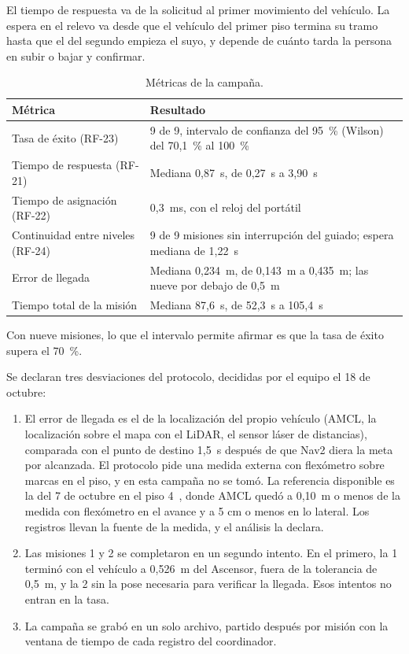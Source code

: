 \documentclass[12pt,letterpaper]{article}
\begin{document}
El tiempo de respuesta va de la solicitud al primer movimiento del vehículo. La espera en el relevo va desde que el vehículo del primer piso termina su tramo hasta que el del segundo empieza el suyo, y depende de cuánto tarda la persona en subir o bajar y confirmar.

\begin{table}[H]
    \centering
    \small
    \caption{Métricas de la campaña.}
    \label{tab:metricas}
    \begin{tabular}{@{}p{6.0cm}p{8.0cm}@{}}
        \toprule
        \textbf{Métrica} & \textbf{Resultado} \\ \midrule
        Tasa de éxito (RF-23) & 9 de 9, intervalo de confianza del 95~\% (Wilson) del 70,1~\% al 100~\% \\ \addlinespace
        Tiempo de respuesta (RF-21) & Mediana 0,87~s, de 0,27~s a 3,90~s \\ \addlinespace
        Tiempo de asignación (RF-22) & 0,3~ms, con el reloj del portátil \\ \addlinespace
        Continuidad entre niveles (RF-24) & 9 de 9 misiones sin interrupción del guiado; espera mediana de 1,22~s \\ \addlinespace
        Error de llegada & Mediana 0,234~m, de 0,143~m a 0,435~m; las nueve por debajo de 0,5~m \\ \addlinespace
        Tiempo total de la misión & Mediana 87,6~s, de 52,3~s a 105,4~s \\ \bottomrule
    \end{tabular}
\end{table}

Con nueve misiones, lo que el intervalo permite afirmar es que la tasa de éxito supera el 70~\%.

Se declaran tres desviaciones del protocolo, decididas por el equipo el 18 de octubre:

\begin{enumerate}[leftmargin=*]
    \item El error de llegada es el de la localización del propio vehículo (AMCL, la localización sobre el mapa con el LiDAR, el sensor láser de distancias), comparada con el punto de destino 1,5~s después de que Nav2 diera la meta por alcanzada. El protocolo pide una medida externa con flexómetro sobre marcas en el piso, y en esta campaña no se tomó. La referencia disponible es la del 7 de octubre en el piso 4~\cite{piso4}, donde AMCL quedó a 0,10~m o menos de la medida con flexómetro en el avance y a 5 cm o menos en lo lateral. Los registros llevan la fuente de la medida, y el análisis la declara.
    \item Las misiones 1 y 2 se completaron en un segundo intento. En el primero, la 1 terminó con el vehículo a 0,526~m del Ascensor, fuera de la tolerancia de 0,5~m, y la 2 sin la pose necesaria para verificar la llegada. Esos intentos no entran en la tasa.
    \item La campaña se grabó en un solo archivo, partido después por misión con la ventana de tiempo de cada registro del coordinador.
\end{enumerate}
\end{document}
